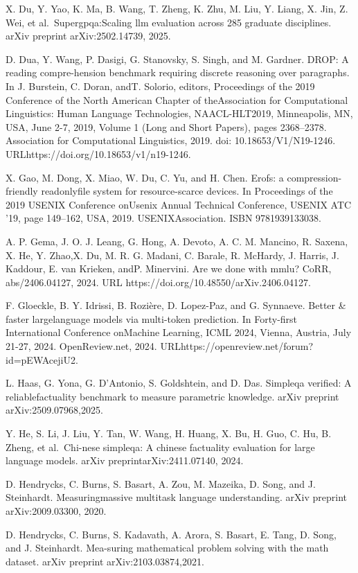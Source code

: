 \documentclass[
  10
]{article}
\begin{document}
X. Du, Y. Yao, K. Ma, B. Wang, T. Zheng, K. Zhu, M. Liu, Y. Liang, X.
Jin, Z. Wei, et al.~Supergpqa:Scaling llm evaluation across 285 graduate
disciplines. arXiv preprint arXiv:2502.14739, 2025.

D. Dua, Y. Wang, P. Dasigi, G. Stanovsky, S. Singh, and M. Gardner.
DROP: A reading compre-hension benchmark requiring discrete reasoning
over paragraphs. In J. Burstein, C. Doran, andT. Solorio, editors,
Proceedings of the 2019 Conference of the North American Chapter of
theAssociation for Computational Linguistics: Human Language
Technologies, NAACL-HLT2019, Minneapolis, MN, USA, June 2-7, 2019,
Volume 1 (Long and Short Papers), pages 2368--2378. Association for
Computational Linguistics, 2019. doi: 10.18653/V1/N19-1246.
URLhttps://doi.org/10.18653/v1/n19-1246.

X. Gao, M. Dong, X. Miao, W. Du, C. Yu, and H. Chen. Erofs: a
compression-friendly readonlyfile system for resource-scarce devices. In
Proceedings of the 2019 USENIX Conference onUsenix Annual Technical
Conference, USENIX ATC '19, page 149--162, USA, 2019. USENIXAssociation.
ISBN 9781939133038.

A. P. Gema, J. O. J. Leang, G. Hong, A. Devoto, A. C. M. Mancino, R.
Saxena, X. He, Y. Zhao,X. Du, M. R. G. Madani, C. Barale, R. McHardy, J.
Harris, J. Kaddour, E. van Krieken, andP. Minervini. Are we done with
mmlu? CoRR, abs/2406.04127, 2024. URL
https://doi.org/10.48550/arXiv.2406.04127.

F. Gloeckle, B. Y. Idrissi, B. Rozière, D. Lopez-Paz, and G. Synnaeve.
Better \& faster largelanguage models via multi-token prediction. In
Forty-first International Conference onMachine Learning, ICML 2024,
Vienna, Austria, July 21-27, 2024. OpenReview.net, 2024.
URLhttps://openreview.net/forum?id=pEWAcejiU2.

L. Haas, G. Yona, G. D'Antonio, S. Goldshtein, and D. Das. Simpleqa
verified: A reliablefactuality benchmark to measure parametric
knowledge. arXiv preprint arXiv:2509.07968,2025.

Y. He, S. Li, J. Liu, Y. Tan, W. Wang, H. Huang, X. Bu, H. Guo, C. Hu,
B. Zheng, et al.~Chi-nese simpleqa: A chinese factuality evaluation for
large language models. arXiv preprintarXiv:2411.07140, 2024.

D. Hendrycks, C. Burns, S. Basart, A. Zou, M. Mazeika, D. Song, and J.
Steinhardt. Measuringmassive multitask language understanding. arXiv
preprint arXiv:2009.03300, 2020.

D. Hendrycks, C. Burns, S. Kadavath, A. Arora, S. Basart, E. Tang, D.
Song, and J. Steinhardt. Mea-suring mathematical problem solving with
the math dataset. arXiv preprint arXiv:2103.03874,2021.
\end{document}
